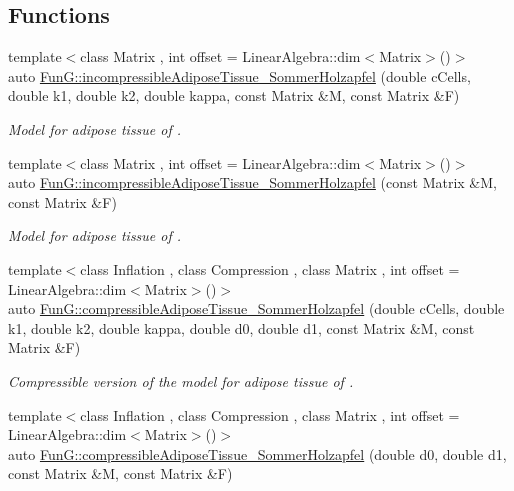 \subsection*{Functions}
\begin{DoxyCompactItemize}
\item 
{\footnotesize template$<$class Matrix , int offset = Linear\+Algebra\+::dim$<$\+Matrix$>$()$>$ }\\auto \hyperlink{group__Biomechanics_gac269eefc1abb994044e1634c20a98061}{Fun\+G\+::incompressible\+Adipose\+Tissue\+\_\+\+Sommer\+Holzapfel} (double c\+Cells, double k1, double k2, double kappa, const Matrix \&M, const Matrix \&F)
\begin{DoxyCompactList}\small\item\em Model for adipose tissue of \cite{Sommer2013}. \end{DoxyCompactList}\item 
{\footnotesize template$<$class Matrix , int offset = Linear\+Algebra\+::dim$<$\+Matrix$>$()$>$ }\\auto \hyperlink{group__Biomechanics_ga01ab128bcf179f4431b0270179af9e20}{Fun\+G\+::incompressible\+Adipose\+Tissue\+\_\+\+Sommer\+Holzapfel} (const Matrix \&M, const Matrix \&F)
\begin{DoxyCompactList}\small\item\em Model for adipose tissue of \cite{Sommer2013}. \end{DoxyCompactList}\item 
{\footnotesize template$<$class Inflation , class Compression , class Matrix , int offset = Linear\+Algebra\+::dim$<$\+Matrix$>$()$>$ }\\auto \hyperlink{group__Biomechanics_ga5c3388564c0420b62e58f48c739d27f1}{Fun\+G\+::compressible\+Adipose\+Tissue\+\_\+\+Sommer\+Holzapfel} (double c\+Cells, double k1, double k2, double kappa, double d0, double d1, const Matrix \&M, const Matrix \&F)
\begin{DoxyCompactList}\small\item\em Compressible version of the model for adipose tissue of \cite{Sommer2013}. \end{DoxyCompactList}\item 
{\footnotesize template$<$class Inflation , class Compression , class Matrix , int offset = Linear\+Algebra\+::dim$<$\+Matrix$>$()$>$ }\\auto \hyperlink{group__Biomechanics_ga27bb3f7c579ce8c21a69ea4d4d0169d7}{Fun\+G\+::compressible\+Adipose\+Tissue\+\_\+\+Sommer\+Holzapfel} (double d0, double d1, const Matrix \&M, const Matrix \&F)

\end{DoxyCompactItemize}
